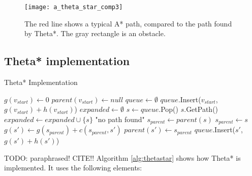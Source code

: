 \begin{figure}
\centering
\texttt{[image: a\_theta\_star\_comp3]}
\caption[A comparison between an A* and Theta* path]{The red line shows a typical A* path, compared to the path found by Theta*. The gray rectangle is an obstacle.}
\label{figure:thetastarcompare}
\end{figure}


\subsection{Theta* implementation}
\begin{algorithm}
\caption{Theta* Implementation}
\label{alg:thetastar}
\begin{algorithmic}[1]
	\State $g(v_{start}) \leftarrow 0$
	\State $parent(v_{start}) \leftarrow null$
	\State $queue \leftarrow \emptyset$
	\State $queue$.Insert($v_{start}$, $g(v_{start}) + h(v_{start})$)
	\State $expanded \leftarrow \emptyset$
		\State $s \leftarrow queue$.Pop()
			\Return $s$.GetPath()
		\EndIf
		\State $expanded \leftarrow expanded \cup \{s\}$
			\EndIf
		\EndFor
	\EndWhile
	\Return "no path found"
\EndFunction
{}
		\State $s_{parent} \leftarrow parent(s)$
	\Else
		\State $s_{parent} \leftarrow s$	
	\EndIf
		\State $g(s') \leftarrow g(s_{parent}) + c(s_{parent},s')$
		\State $parent(s') \leftarrow s_{parent}$
		\State $queue$.Insert($s'$,$g(s') + h(s')$)
	\EndIf
\EndFunction{}
\end{algorithmic}
\end{algorithm}
TODO: paraphrased! CITE!!
Algorithm \ref{alg:thetastar} shows how Theta* is implemented. It uses the following elements:
